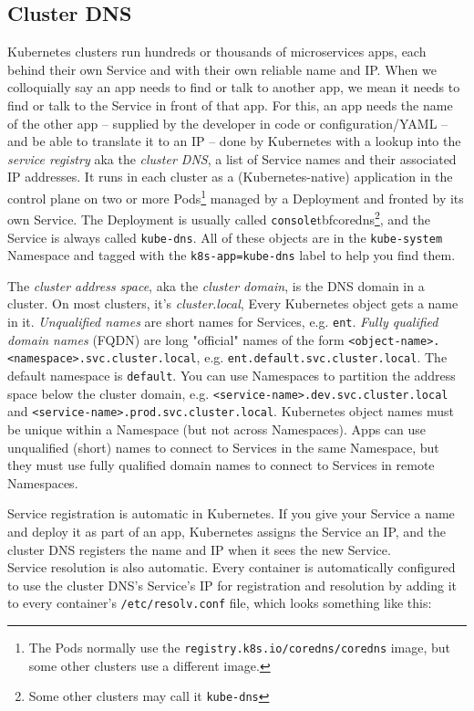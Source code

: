 \documentclass[table, xcdraw]{article}%
\begin{document}
\subsection{Cluster DNS}

Kubernetes clusters run hundreds or thousands of microservices apps, each behind their own Service and with their own reliable name and IP. When we colloquially say an app needs to find or talk to another app, we mean it needs
to find or talk to the Service in front of that app. For this, an app needs the name of the other app -- supplied by the developer in code or configuration/YAML -- and be able to translate it to an IP -- done by Kubernetes with a lookup into the \emph{service registry} aka the \emph{cluster DNS}, a list of Service names and their associated IP addresses. It runs in each cluster as a (Kubernetes-native) application in the control plane on two or more Pods\footnote{The Pods normally use the \texttt{registry.k8s.io/coredns/coredns} image, but some other clusters use a different image.} managed by a Deployment and fronted by its own Service. The Deployment is usually called \texttt{console}tbf{coredns}\footnote{Some other clusters may call it \texttt{kube-dns}}, and the Service is always called \texttt{kube-dns}. All of these objects are in the \texttt{kube-system} Namespace and tagged with the \texttt{k8s-app=kube-dns} label to help you find them.

The \emph{cluster address space}, aka the \emph{cluster domain}, is the DNS domain in a cluster. On most clusters, it’s \emph{cluster.local}, Every Kubernetes object gets a name in it. \emph{Unqualified names} are short names for Services, e.g. \texttt{ent}. \emph{Fully qualified domain names} (FQDN) are long "official" names of the form \texttt{<object-name>.<namespace>.svc.cluster.local}, e.g. \texttt{ent.default.svc.cluster.local}. The default namespace is \texttt{default}. You can use Namespaces to partition the address space below the cluster domain, e.g. \texttt{<service-name>.dev.svc.cluster.local} and \texttt{<service-name>.prod.svc.cluster.local}. Kubernetes object names must be unique within a Namespace (but not across Namespaces). Apps can use unqualified (short) names to connect to Services in the same Namespace, but they must use fully qualified domain names to connect to Services in remote Namespaces.

Service registration is automatic in Kubernetes. If you give your Service a name and deploy it as part of an app, Kubernetes assigns the Service an IP, and the cluster DNS registers the name and IP when it sees the new Service.\\
Service resolution is also automatic. Every container is automatically configured to use the cluster DNS's Service's IP for registration and resolution by adding it to every container's \texttt{/etc/resolv.conf} file, which looks something like this:
\end{document}
